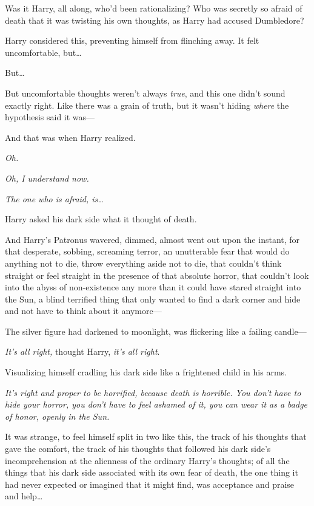 Was it Harry, all along, who'd been rationalizing? Who was secretly so afraid of death that it was twisting his own thoughts, as Harry had accused Dumbledore?

Harry considered this, preventing himself from flinching away. It felt uncomfortable, but{\ldots}

But{\ldots}

But uncomfortable thoughts weren't always \emph{true}, and this one didn't sound exactly right. Like there was a grain of truth, but it wasn't hiding \emph{where} the hypothesis said it was---

And that was when Harry realized.

\emph{Oh.}

\emph{Oh, I understand now.}

\emph{The one who is afraid, is{\ldots}}

Harry asked his dark side what it thought of death.

And Harry's Patronus wavered, dimmed, almost went out upon the instant, for that desperate, sobbing, screaming terror, an unutterable fear that would do anything not to die, throw everything aside not to die, that couldn't think straight or feel straight in the presence of that absolute horror, that couldn't look into the abyss of non-existence any more than it could have stared straight into the Sun, a blind terrified thing that only wanted to find a dark corner and hide and not have to think about it anymore---

The silver figure had darkened to moonlight, was flickering like a failing candle---

\emph{It's all right,} thought Harry, \emph{it's all right}.

Visualizing himself cradling his dark side like a frightened child in his arms.

\emph{It's right and proper to be horrified, because death is horrible. You don't have to hide your horror, you don't have to feel ashamed of it, you can wear it as a badge of honor, openly in the Sun.}

It was strange, to feel himself split in two like this, the track of his thoughts that gave the comfort, the track of his thoughts that followed his dark side's incomprehension at the alienness of the ordinary Harry's thoughts; of all the things that his dark side associated with its own fear of death, the one thing it had never expected or imagined that it might find, was acceptance and praise and help{\ldots}


